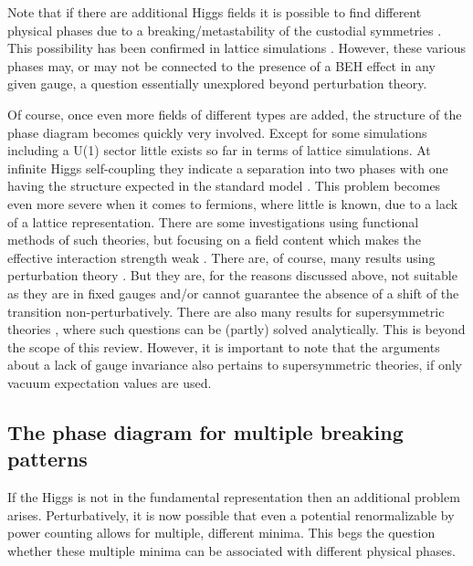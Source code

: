 \documentclass[final,12pt,3p,longtitle]{elsarticle}
\newcommand*{\1}{1\!\!\!\bot}
\begin{document}
Note that if there are additional Higgs fields it is possible to find different physical phases due to a breaking/metastability of the custodial symmetries \cite{Branco:2011iw,Ivanov:2017dad}. This possibility has been confirmed in lattice simulations \cite{Lewis:2010ps,Wurtz:2009gf}. However, these various phases may, or may not be connected to the presence of a BEH effect in any given gauge, a question essentially unexplored beyond perturbation theory.

Of course, once even more fields of different types are added, the structure of the phase diagram becomes quickly very involved. Except for some simulations including a U(1) sector \cite{Shrock:1985un,Zubkov:2010np,Zubkov:2011sk,Zubkov:2011ia} little exists so far in terms of lattice simulations. At infinite Higgs self-coupling they indicate a separation into two phases with one having the structure expected in the standard model \cite{Shrock:1985ur}. This problem becomes even more severe when it comes to fermions, where little is known, due to a lack of a lattice representation. There are some investigations using functional methods of such theories, but focusing on a field content which makes the effective interaction strength weak \cite{Litim:2014uca,Litim:2015iea}. There are, of course, many results using perturbation theory \cite{Kapusta:2006pm,Branco:2011iw,Ivanov:2017dad}. But they are, for the reasons discussed above, not suitable as they are in fixed gauges and/or cannot guarantee the absence of a shift of the transition non-perturbatively. There are also many results for supersymmetric theories \cite{Weinberg:2000cr}, where such questions can be (partly) solved analytically. This is beyond the scope of this review. However, it is important to note that the arguments about a lack of gauge invariance also pertains to supersymmetric theories, if only vacuum expectation values are used.

\subsection{The phase diagram for multiple breaking patterns}\label{ss:strata}

If the Higgs is not in the fundamental representation then an additional problem arises. Perturbatively, it is now possible that even a potential renormalizable by power counting allows for multiple, different minima. This begs the question whether these multiple minima can be associated with different physical phases.
\end{document}
